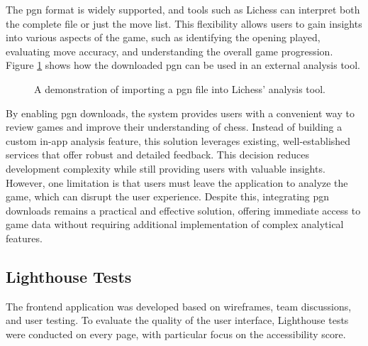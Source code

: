 The \gls{pgn} format is widely supported, and tools such as Lichess can interpret both the complete file or just the move list. This flexibility allows users to gain insights into various aspects of the game, such as identifying the opening played, evaluating move accuracy, and understanding the overall game progression. Figure \ref{fig:downloaded-pgn-analysis} shows how the downloaded \gls{pgn} can be used in an external analysis tool. \\

\begin{figure}[h!] 
    \centering 
    \caption[Lichess analysis tool]{A demonstration of importing a \gls{pgn} file into Lichess' analysis tool.}
    \label{fig:downloaded-pgn-analysis} 
\end{figure}

By enabling \gls{pgn} downloads, the system provides users with a convenient way to review games and improve their understanding of chess. Instead of building a custom in-app analysis feature, this solution leverages existing, well-established services that offer robust and detailed feedback. This decision reduces development complexity while still providing users with valuable insights. \\

However, one limitation is that users must leave the application to analyze the game, which can disrupt the user experience. Despite this, integrating \gls{pgn} downloads remains a practical and effective solution, offering immediate access to game data without requiring additional implementation of complex analytical features.

\subsection{Lighthouse Tests}
The frontend application was developed based on wireframes, team discussions, and user testing. To evaluate the quality of the user interface, Lighthouse tests were conducted on every page, with particular focus on the accessibility score. \\

